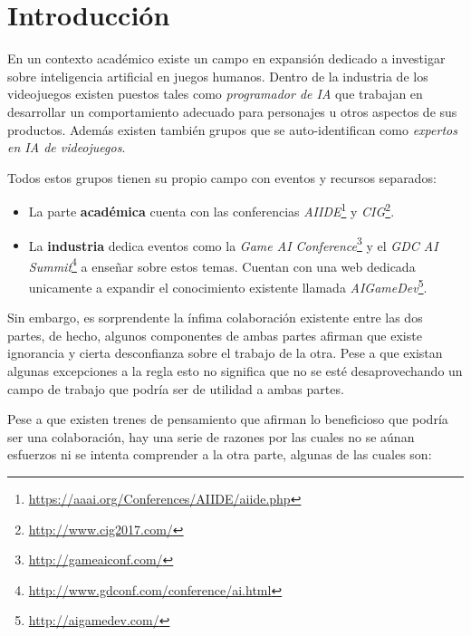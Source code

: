 \chapter{Introducción}

En un contexto académico existe un campo en expansión dedicado a investigar sobre inteligencia artificial en juegos humanos. Dentro de la industria de los videojuegos existen puestos tales como \textit{programador de IA} que trabajan en desarrollar un comportamiento adecuado para personajes u otros aspectos de sus productos. Además existen también grupos que se auto-identifican como \textit{expertos en IA de videojuegos}.

\bigskip

Todos estos grupos tienen su propio campo con eventos y recursos separados:

\begin{itemize}
	\item La parte \textbf{académica} cuenta con las conferencias \textit{AIIDE}\footnote{\url{https://aaai.org/Conferences/AIIDE/aiide.php}} y \textit{CIG}\footnote{\url{http://www.cig2017.com/}}.
	\item La \textbf{industria} dedica eventos como la \textit{Game AI Conference}\footnote{\url{http://gameaiconf.com/}} y el \textit{GDC AI Summit}\footnote{\url{http://www.gdconf.com/conference/ai.html}} a enseñar sobre estos temas. Cuentan con una web dedicada unicamente a expandir el conocimiento existente llamada \textit{AIGameDev}\footnote{\url{http://aigamedev.com/}}.
\end{itemize}

\bigskip

Sin embargo, es sorprendente la ínfima colaboración existente entre las dos partes, de hecho, algunos componentes de ambas partes afirman que existe ignorancia y cierta desconfianza sobre el trabajo de la otra. Pese a que existan algunas excepciones a la regla esto no significa que no se esté desaprovechando un campo de trabajo que podría ser de utilidad a ambas partes\cite{blog:emerging}.

\bigskip

Pese a que existen trenes de pensamiento que afirman lo beneficioso que podría ser una colaboración\cite{cio}, hay una serie de razones por las cuales no se aúnan esfuerzos ni se intenta comprender a la otra parte, algunas de las cuales son:

